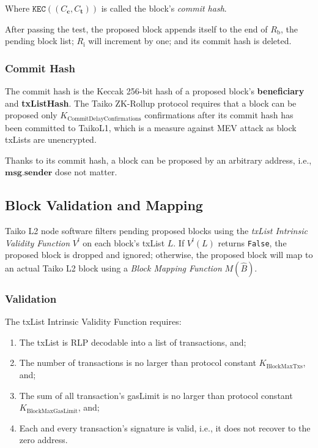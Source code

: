 \documentclass[9pt,oneside]{amsart}
\begin{document}
\begin{multicols}{2}
Where $\texttt{KEC}((C_{\mathbf{c}}, C_{\mathbf{t}}))$ is called the block's \textit{commit hash}.

After passing the test, the proposed block appends itself to the end of $R_\mathrm{b}$, the pending block list; $R_\mathrm{i}$ will increment by one; and its commit hash is deleted.


\subsubsection{Commit Hash} The commit hash is the Keccak 256-bit hash of a proposed block's \textbf{beneficiary} and \textbf{txListHash}. The Taiko ZK-Rollup protocol requires that a block can be proposed only $K_{\mathrm{CommitDelayConfirmations}}$ confirmations after its commit hash has been committed to  {TaikoL1}, which is a measure against MEV attack \cite{mevethfoundation} as block txLists are unencrypted.

Thanks to its commit hash, a block can be proposed by an arbitrary address, i.e., $\mathbf{msg.sender}$ dose not matter.

\subsection{Block Validation and Mapping } \label{sec:filtermap}
Taiko L2 node software filters pending proposed blocks using the \textit{txList Intrinsic Validity Function} $V^l$ on each block's txList $L$. If $V^l(L)$ returns \texttt{False}, the proposed block is dropped and ignored; otherwise, the proposed block will map to an actual Taiko L2 block using a \textit{Block Mapping Function} $M(\hat{B})$.

\subsubsection{Validation} The txList Intrinsic Validity Function requires:

\begin{enumerate}
\item The txList is RLP decodable into a list of transactions, and;
\item The number of transactions is no larger than  protocol constant $ K_{\mathrm{BlockMaxTxs}}$, and;
\item The sum of all transaction's gasLimit is no larger than protocol constant $K_{\mathrm{BlockMaxGasLimit}}$, and;
\item Each and every transaction's signature is valid, i.e., it does not recover to the zero address.
\end{enumerate}


\end{multicols}
\end{document}
